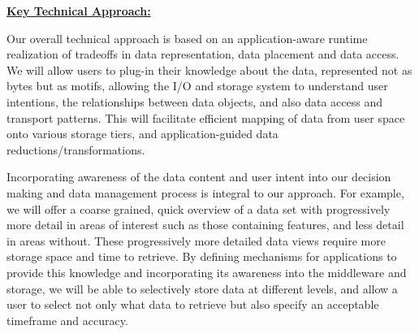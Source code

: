 \documentclass[11pt,letterpaper]{article}
\newcommand{\TODO}[1]{\textcolor{red}{ TO DO: #1 }}
\newcommand{\TODO}[1]{}
\begin{document}
%  
% 


\underline{\textbf{Key Technical Approach:}}

Our overall technical approach is based on an application-aware runtime
realization of tradeoffs in data representation, data placement and data
access. We will allow users to plug-in their knowledge 
about the data, represented not as bytes but as motifs, allowing the I/O and 
storage system to understand user
intentions, the relationships between data objects, and also data access
and transport patterns. This will facilitate efficient mapping of data from
user space onto various storage tiers, and application-guided
data reductions/transformations.


Incorporating awareness of the data content and user intent  into
our decision making and data management process is integral to our approach. For example, 
we will offer a coarse grained, quick overview of a data set with progressively more detail in 
areas of interest such as those containing features, and less detail in areas
without. These progressively more detailed data views require more storage
space and time to retrieve. By defining mechanisms for applications to provide this 
knowledge and incorporating its awareness into the middleware and storage,
we will be able to selectively store data at different levels, and allow a user to select 
not only what data to retrieve but also specify an acceptable timeframe and accuracy.
\end{document}

